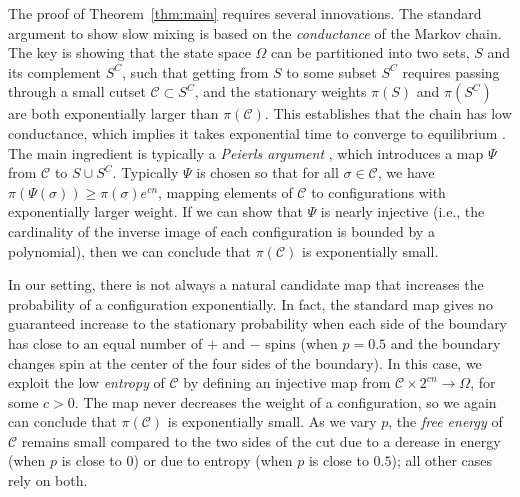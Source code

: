 \documentclass[letterpaper,english,numberwithinsect]{amsart}
\newcommand{\cC}{\mathcal{C}}
\begin{document}
The proof of Theorem~\ref{thm:main} requires several innovations.
The standard argument to show slow mixing is based on the {\it conductance} of the Markov chain.  The key is showing that the state space $\Omega$ can be partitioned into two sets, $S$ and its complement $S^C$, such that getting from $S$ to some subset $S^C$ requires passing through a small cutset  $\cC \subset S^C$, and the stationary weights $\pi(S)$ and $\pi(S^C)$ are both exponentially larger than $\pi(\cC)$.  This establishes that the chain has low conductance, which implies it takes exponential time to converge to equilibrium \cite{js}.   
The main ingredient is typically a {\it Peierls argument} \cite{peierls}, which introduces a map $\Psi$ from $\cC$ to $S \cup S^C$.  Typically $\Psi$ is chosen so that for all $\sigma \in \cC$, we have $\pi(\Psi(\sigma)) \geq \pi(\sigma) e^{cn}$, mapping elements of $\cC$ to configurations with exponentially larger weight.  If we can show that $\Psi$ is nearly injective  (i.e., the cardinality of the inverse image of each configuration is bounded by a polynomial), then we can conclude that $\pi(\cC)$ is exponentially small.   


In our setting, there is not always  a natural candidate map that increases the probability of a configuration exponentially. In fact, the standard map gives no guaranteed increase to the stationary probability when each side of the boundary has close to an equal number of $+$ and $-$ spins (when $p=0.5$ and the boundary changes spin at the center of the four sides of the boundary).  In this case, we exploit the low {\it entropy} of $\cC$ by defining an injective map from $\cC \times 2^{cn} \rightarrow \Omega$, for some $c>0$.  The map never decreases the weight of a configuration, so we again can conclude that $\pi(\cC)$ is exponentially small.  As we vary $p$, the {\it free energy} of $\cC$ remains small  compared to the two sides of the cut due to a derease in  energy (when $p$ is close to $0$) or due to entropy  (when $p$ is close to $0.5$); all other cases rely on both.
\end{document}
